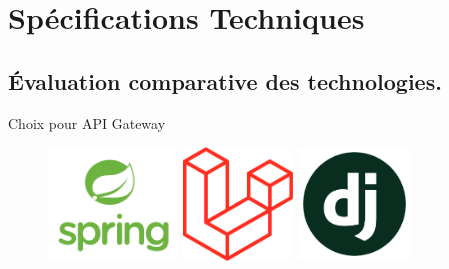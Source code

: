 \section{Spécifications Techniques}


\subsection{Évaluation comparative des technologies.}
\begin{frame}{Choix pour API Gateway}
    \begin{figure}[H]
        \centering
        \begin{minipage}{0.32\textwidth}
            \centering
            \includegraphics[height=3cm]{assets/images/spring.png}
        \end{minipage}%
        \hspace{0.03\textwidth}
        \begin{minipage}{0.32\textwidth}
            \centering
            \includegraphics[height=3cm]{assets/images/laravel.png}
        \end{minipage}%
        \hspace{0.03\textwidth}
        \begin{minipage}{0.32\textwidth}
            \centering
            \includegraphics[height=3cm]{assets/images/django.png}
        \end{minipage}
    \end{figure}
\end{frame}

